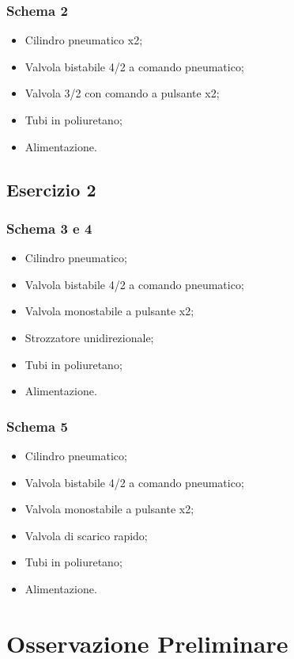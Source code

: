 \documentclass[a4paper]{article}
\begin{document}
\subsubsection{Schema 2}
\begin{itemize}
\item Cilindro pneumatico x2;
\item Valvola bistabile 4/2 a comando pneumatico;
\item Valvola 3/2 con comando a pulsante x2;
\item Tubi in poliuretano;
\item Alimentazione.
\end{itemize}

\subsection{Esercizio 2}
\subsubsection{Schema 3 e 4}
\begin{itemize}
\item Cilindro pneumatico;
\item Valvola bistabile 4/2 a comando pneumatico;
\item Valvola monostabile a pulsante x2;
\item Strozzatore unidirezionale;
\item Tubi in poliuretano;
\item Alimentazione.
\end{itemize}


\subsubsection{Schema 5}
\begin{itemize}
\item Cilindro pneumatico;
\item Valvola bistabile 4/2 a comando pneumatico;
\item Valvola monostabile a pulsante x2;
\item Valvola di scarico rapido;
\item Tubi in poliuretano;
\item Alimentazione.
\end{itemize}

\section{Osservazione Preliminare}
\end{document}
